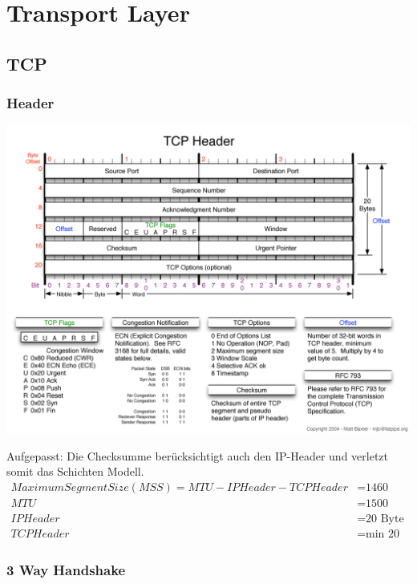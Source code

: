 \section{Transport Layer}


\subsection{TCP}

\subsubsection{Header}

\includegraphics[width=\textwidth]{media/TCPHeader.png}

Aufgepasst: Die Checksumme berücksichtigt auch den IP-Header und verletzt somit das Schichten Modell. \\

\begin{align*}
	Maximum Segment Size (MSS) = MTU - IPHeader - TCP Header & = \textrm{1460 Byte}\\
	MTU &= \textrm{1500 Byte}\\
	IPHeader &= \textrm{20 Byte}\\
	TCPHeader &= \textrm{min 20 Byte}
\end{align*}

\subsubsection{3 Way Handshake}

